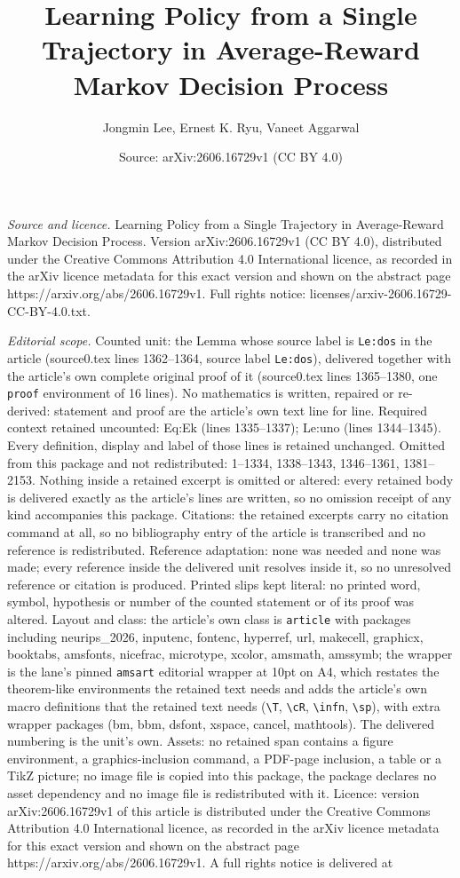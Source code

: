 \documentclass[10pt,a4paper]{amsart}
\title[Learning Policy from a Single Trajectory in Average-Reward M]{Learning Policy from a Single Trajectory in Average-Reward Markov Decision Process}
\author{Jongmin Lee, Ernest K. Ryu, Vaneet Aggarwal}
\date{Source: arXiv:2606.16729v1 (CC BY 4.0)}
\begin{document}
\maketitle

\noindent\emph{Source and licence.} Learning Policy from a Single Trajectory in Average-Reward Markov Decision Process. Version arXiv:2606.16729v1 (CC BY 4.0), distributed under the Creative Commons Attribution 4.0 International licence, as recorded in the arXiv licence metadata for this exact version and shown on the abstract page https://arxiv.org/abs/2606.16729v1. Full rights notice: licenses/arxiv-2606.16729-CC-BY-4.0.txt.\par\smallskip

\noindent\textit{Editorial scope.} Counted unit: the Lemma whose source label is \texttt{Le:dos} in the article (source0.tex lines 1362--1364, source label \texttt{Le:dos}), delivered together with the article's own complete original proof of it (source0.tex lines 1365--1380, one \texttt{proof} environment of 16 lines). No mathematics is written, repaired or re-derived: statement and proof are the article's own text line for line. Required context retained uncounted: Eq:Ek (lines 1335--1337); Le:uno (lines 1344--1345). Every definition, display and label of those lines is retained unchanged. Omitted from this package and not redistributed: 1--1334, 1338--1343, 1346--1361, 1381--2153. Nothing inside a retained excerpt is omitted or altered: every retained body is delivered exactly as the article's lines are written, so no omission receipt of any kind accompanies this package. Citations: the retained excerpts carry no citation command at all, so no bibliography entry of the article is transcribed and no reference is redistributed. Reference adaptation: none was needed and none was made; every reference inside the delivered unit resolves inside it, so no unresolved reference or citation is produced. Printed slips kept literal: no printed word, symbol, hypothesis or number of the counted statement or of its proof was altered. Layout and class: the article's own class is \texttt{article} with packages including neurips\_2026, inputenc, fontenc, hyperref, url, makecell, graphicx, booktabs, amsfonts, nicefrac, microtype, xcolor, amsmath, amssymb; the wrapper is the lane's pinned \texttt{amsart} editorial wrapper at 10pt on A4, which restates the theorem-like environments the retained text needs and adds the article's own macro definitions that the retained text needs (\texttt{\textbackslash T}, \texttt{\textbackslash cR}, \texttt{\textbackslash infn}, \texttt{\textbackslash sp}), with extra wrapper packages (bm, bbm, dsfont, xspace, cancel, mathtools). The delivered numbering is the unit's own. Assets: no retained span contains a figure environment, a graphics-inclusion command, a PDF-page inclusion, a table or a TikZ picture; no image file is copied into this package, the package declares no asset dependency and no image file is redistributed with it. Licence: version arXiv:2606.16729v1 of this article is distributed under the Creative Commons Attribution 4.0 International licence, as recorded in the arXiv licence metadata for this exact version and shown on the abstract page https://arxiv.org/abs/2606.16729v1. A full rights notice is delivered at 
\end{document}
